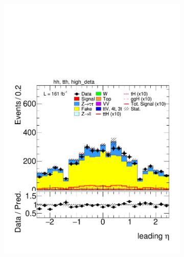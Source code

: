 \begin{figure}[htbp]
\begin{subfigure}[b]{0.45\textwidth}
        \includegraphics[width=\textwidth]{images/using_highdeta_ffs_run3_inclusive_withscaling/plot_tau_0_eta_hh_tth_22_23_24_high_deta.pdf}
        \caption{}
      \end{subfigure}
  

\end{figure}
